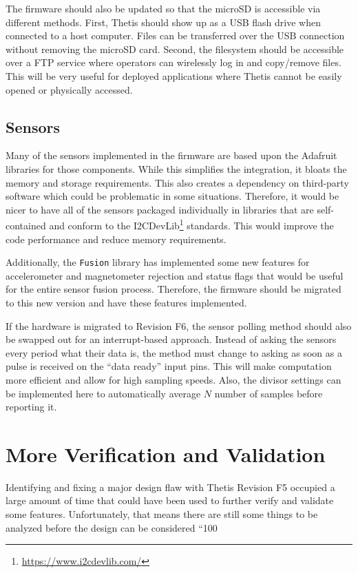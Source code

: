 The firmware should also be updated so that the microSD is accessible via different methods.
First, Thetis should show up as a USB flash drive when connected to a host computer.
Files can be transferred over the USB connection without removing the microSD card.
Second, the filesystem should be accessible over a FTP service where operators can wirelessly log in and copy/remove files.
This will be very useful for deployed applications where Thetis cannot be easily opened or physically accessed.

\subsection{Sensors} 
Many of the sensors implemented in the firmware are based upon the Adafruit libraries for those components.
While this simplifies the integration, it bloats the memory and storage requirements.
This also creates a dependency on third-party software which could be problematic in some situations.
Therefore, it would be nicer to have all of the sensors packaged individually in libraries that are self-contained and conform to the I2CDevLib\footnote{\url{https://www.i2cdevlib.com/}} standards.
This would improve the code performance and reduce memory requirements.

Additionally, the \lstinline[style=customInline]|Fusion| library has implemented some new features for accelerometer and magnetometer rejection and status flags that would be useful for the entire sensor fusion process.
Therefore, the firmware should be migrated to this new version and have these features implemented.

If the hardware is migrated to Revision F6, the sensor polling method should also be swapped out for an interrupt-based approach.
Instead of asking the sensors every period what their data is, the method must change to asking as soon as a pulse is received on the ``data ready'' input pins.
This will make computation more efficient and allow for high sampling speeds.
Also, the divisor settings can be implemented here to automatically average $N$ number of samples before reporting it.

\section{More Verification and Validation} 
Identifying and fixing a major design flaw with Thetis Revision F5 occupied a large amount of time that could have been used to further verify and validate some features.
Unfortunately, that means there are still some things to be analyzed before the design can be considered ``100%

